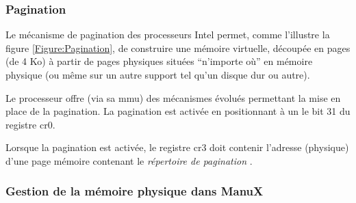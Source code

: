 \subsubsection{Pagination}

   Le mécanisme de pagination des processeurs Intel permet, comme
l'illustre la figure \ref{Figure:Pagination}, de construire une
mémoire virtuelle, découpée en pages (de 4 Ko) à partir de pages
physiques situées ``n'importe où'' en mémoire physique (ou même sur un
autre support tel qu'un disque dur ou autre).

   Le processeur offre (via sa {\sc mmu}) des mécanismes évolués
permettant la mise en place de la pagination. La pagination est
activée en positionnant à un le bit 31 du registre {\sc cr0}.

   Lorsque la pagination est activée, le registre {\sc cr3} doit
contenir l'adresse (physique) d'une page mémoire contenant le {\em
répertoire de pagination} .

\subsubsection{Gestion de la mémoire physique dans ManuX}

